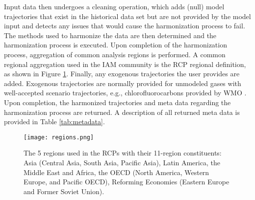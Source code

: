 Input data then undergoes a cleaning operation, which adds (null) model
trajectories that exist in the historical data set but are not provided by the
model input and detects any issues that would cause the harmonization process to
fail. The methods used to harmonize the data are then determined and the
harmonization process is executed. Upon completion of the harmonization process,
aggregation of common analysis regions is performed. A common regional
aggregation used in the IAM community is the RCP regional definition, as shown
in Figure \ref{fig:regions}. Finally, any exogenous trajectories the user provides
are added. Exogenous trajectories are normally provided for unmodeled gases with
well-accepted scenario trajectories, e.g., chlorofluorocarbons provided by WMO
\cite{wmo2014}. Upon completion, the harmonized trajectories and meta data
regarding the harmonization process are returned. A description of all returned
meta data is provided in Table \ref{tab:metadata}.


\begin{figure}
  \begin{center}
    \texttt{[image: regions.png]}
    \caption[]{
      \label{fig:regions}
      The 5 regions used in the RCPs with their 11-region constituents: Asia
      (Central Asia, South Asia, Pacific Asia), Latin America, the Middle East
      and Africa, the OECD (North America, Western Europe, and Pacific OECD),
      Reforming Economies (Eastern Europe and Former Soviet Union).
    }
  \end{center}
\end{figure}


